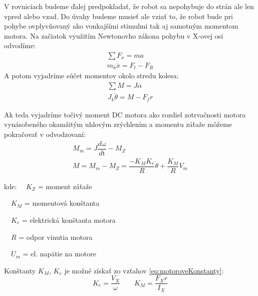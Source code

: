 V rovniciach budeme ďalej predpokladať, že robot sa nepohybuje do strán ale len vpred alebo vzad. Do úvahy budeme musieť ale vziať to, že robot bude pri pohybe ovplyvňovaný ako vonkajšími stimulmi tak aj samotným momentom motora. Na začiatok využitím Newtonovho zákona pohybu v X-ovej osi odvodíme:
\begin{equation}
\begin{gathered}
\sum{F_x} = ma \\
m_k \ddot{x} = F_t - F_R
\end{gathered}
\label{eq:forceOnWheeles}
\end{equation}
A potom vyjadríme súčet momentov okolo stredu kolesa:
\begin{equation}
\begin{gathered}
\sum{M} = J \alpha \\
J_k\ddot{\theta} = M - F_f r
\end{gathered}
\label{eq:zotrvacnost}
\end{equation}

Ak teda vyjadríme točivý moment DC motora ako rozdiel zotrvačnosti motora vynásobeného okamžitým uhlovým zrýchlením a momentu záťaže môžeme pokračovať v odvodzovaní:
\begin{equation}
\begin{gathered}
M_m = J \dfrac{d \mathrm{\omega}}{d \mathrm{t}} - M_Z
\\
M = M_m - M_Z = \dfrac{-K_M K_e}{R} \dot{\theta}+ \dfrac{K_M}{R} V_m
\end{gathered}
\label{eq:moment}
\end{equation}

kde:
$\quad K_Z$ = moment záťaže

$\quad K_M$ = momentová konštanta

$\quad K_e$ = elektrická konštanta motora

$\quad R$ = odpor vinutia motora

$\quad U_m$ = el. napätie na motore

Konštanty $K_M$, $K_e$ je možné získať zo vzťahov \eqref{eq:motoroveKonstanty}:
\begin{equation}
K_e = \dfrac{V_X}{\omega} \quad \quad K_M = \dfrac{F_X r}{I_X}
\label{eq:motoroveKonstanty}
\end{equation}


